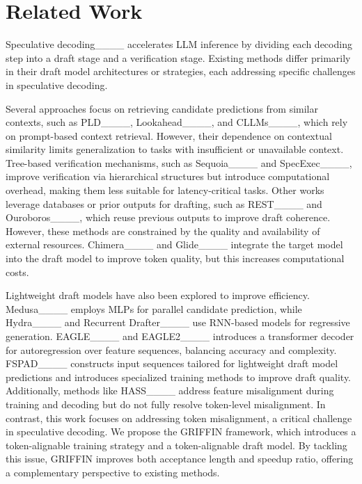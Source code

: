 \section{Related Work}
Speculative decoding____ accelerates LLM inference by dividing each decoding step into a draft stage and a verification stage. Existing methods differ primarily in their draft model architectures or strategies, each addressing specific challenges in speculative decoding.  

Several approaches focus on retrieving candidate predictions from similar contexts, such as PLD____, Lookahead____, and CLLMs____, which rely on prompt-based context retrieval. However, their dependence on contextual similarity limits generalization to tasks with insufficient or unavailable context. Tree-based verification mechanisms, such as Sequoia____ and SpecExec____, improve verification via hierarchical structures but introduce computational overhead, making them less suitable for latency-critical tasks.
Other works leverage databases or prior outputs for drafting, such as REST____ and Ouroboros____, which reuse previous outputs to improve draft coherence. However, these methods are constrained by the quality and availability of external resources. Chimera____ and Glide____ integrate the target model into the draft model to improve token quality, but this increases computational costs.  

Lightweight draft models have also been explored to improve efficiency. Medusa____ employs MLPs for parallel candidate prediction, while Hydra____ and Recurrent Drafter____ use RNN-based models for regressive generation. EAGLE____ and EAGLE2____ introduces a transformer decoder for autoregression over feature sequences, balancing accuracy and complexity. FSPAD____ constructs input sequences tailored for lightweight draft model predictions and introduces specialized training methods to improve draft quality. Additionally, methods like HASS____ address feature misalignment during training and decoding but do not fully resolve token-level misalignment.  
In contrast, this work focuses on addressing token misalignment, a critical challenge in speculative decoding. We propose the GRIFFIN framework, which introduces a token-alignable training strategy and a token-alignable draft model. By tackling this issue, GRIFFIN improves both acceptance length and speedup ratio, offering a complementary perspective to existing methods.